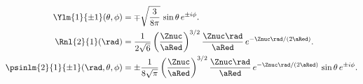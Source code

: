 \begin{align}
\Ylm{1}{\pm 1}(\theta, \phi) &= \mp\sqrt{\frac{3}{8\pi}}\,\sin\theta\,e^{\pm i\phi}.
  \label{c11.eq.y1pm} \\
\Rnl{2}{1}(\rad) &= \frac{1}{2\sqrt{6}}\left(\frac{\Znuc}{\aRed}\right)^{3/2}
    \frac{\Znuc\rad}{\aRed}\,e^{-\Znuc\rad/(2\aRed)}.
  \label{c11.eq.r21} \\
\psinlm{2}{1}{\pm 1}(\rad, \theta, \phi) &= \pm\frac{1}{8\sqrt{\pi}}
    \left(\frac{\Znuc}{\aRed}\right)^{3/2}
    \frac{\Znuc\rad}{\aRed}\,e^{-\Znuc\rad/(2\aRed)}\,\sin\theta\,e^{\pm i\phi}.
  \label{c11.eq.psi21pm}
\end{align}

